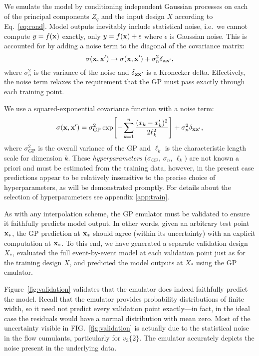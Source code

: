 \documentclass[aps,prc,reprint,superscriptaddress,amsmath]{revtex4-1}
\newcommand{\vnk}[2]{v_#1\{#2\}}
\begin{document}
We emulate the model by conditioning independent Gaussian processes on each of the principal components $Z_q$ and the input design $X$ according to Eq.~\eqref{eq:cond}.
Model outputs inevitably include statistical noise, i.e.\ we cannot compute $y = f(\mathbf x)$ exactly, only $y = f(\mathbf x) + \epsilon$ where $\epsilon$ is Gaussian noise.
This is accounted for by adding a noise term to the diagonal of the covariance matrix:
\begin{equation*}
  \sigma(\mathbf x, \mathbf x') \rightarrow \sigma(\mathbf x, \mathbf x') + \sigma^2_n\delta_{\mathbf x\mathbf x'},
\end{equation*}
where $\sigma^2_n$ is the variance of the noise and $\delta_{\mathbf x\mathbf x'}$ is a Kronecker delta.
Effectively, the noise term relaxes the requirement that the GP must pass exactly through each training point.

We use a squared-exponential covariance function with a noise term:
\begin{equation}
  \sigma(\mathbf x, \mathbf x') = \sigma_\text{GP}^2 \exp\Biggl[ -\sum_{k=1}^n \frac{(x_k - x'_k)^2}{2\ell_k^2} \Biggr] + \sigma_n^2\delta_{\mathbf x\mathbf x'},
  \label{eq:full_cov}
\end{equation}
where $\sigma_\text{GP}^2$ is the overall variance of the GP and $\ell_k$ is the characteristic length scale for dimension $k$.
These \emph{hyperparameters} $(\sigma_\text{GP}$, $\sigma_n$, $\ell_k)$ are not known a priori and must be estimated from the training data, however, in the present case predictions appear to be relatively insensitive to the precise choice of hyperparameters, as will be demonstrated promptly.
For details about the selection of hyperparameters see appendix \ref{app:train}.

As with any interpolation scheme, the GP emulator must be validated to ensure it faithfully predicts model output.
In other words, given an arbitrary test point $\mathbf x_*$, the GP prediction at $\mathbf x_*$ should agree (within its uncertainty) with an explicit computation at $\mathbf x_*$.
To this end, we have generated a separate validation design $X_*$, evaluated the full event-by-event model at each validation point just as for the training design $X$, and predicted the model outputs at $X_*$ using the GP emulator.

Figure~\ref{fig:validation} validates that the emulator does indeed faithfully predict the model.
Recall that the emulator provides probability distributions of finite width, so it need not predict every validation point exactly---in fact, in the ideal case the residuals would have a normal distribution with mean zero.
Most of the uncertainty visible in FIG.~\ref{fig:validation} is actually due to the statistical noise in the flow cumulants, particularly for $\vnk 3 2$.
The emulator accurately depicts the noise present in the underlying data.
\end{document}
